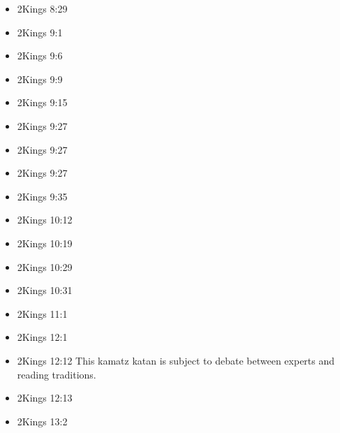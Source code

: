 \documentclass[14pt]{article}
\begin{document}
\begin{multicols}{2}
\begin{itemize}
													\item 2Kings 8:29
													
													\item 2Kings 9:1
													
													\item 2Kings 9:6
													
													\item 2Kings 9:9
													
													\item 2Kings 9:15
													
													\item 2Kings 9:27
													
													\item 2Kings 9:27
													
													\item 2Kings 9:27
													
													\item 2Kings 9:35
													
													\item 2Kings 10:12
													
													\item 2Kings 10:19
													
													\item 2Kings 10:29
													
													\item 2Kings 10:31
													
													\item 2Kings 11:1
													
													\item 2Kings 12:1
													
													\item 2Kings 12:12 This kamatz katan is subject to debate between experts and reading traditions.
													
													\item 2Kings 12:13
													
													\item 2Kings 13:2
													

\end{itemize}
\end{multicols}
\end{document}
